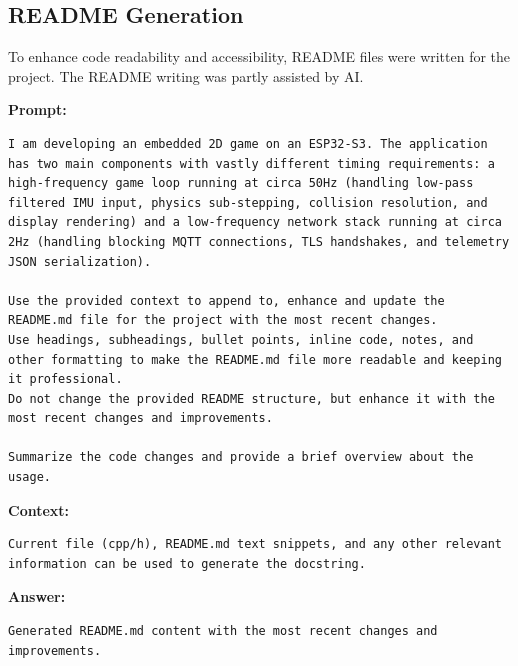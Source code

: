 \subsection*{README Generation}

To enhance code readability and accessibility, README files were written for the project.
The README writing was partly assisted by AI.

\textbf{Prompt:}
\begin{lstlisting}[language={}, breaklines=true]
I am developing an embedded 2D game on an ESP32-S3. The application has two main components with vastly different timing requirements: a high-frequency game loop running at circa 50Hz (handling low-pass filtered IMU input, physics sub-stepping, collision resolution, and display rendering) and a low-frequency network stack running at circa 2Hz (handling blocking MQTT connections, TLS handshakes, and telemetry JSON serialization).

Use the provided context to append to, enhance and update the README.md file for the project with the most recent changes.
Use headings, subheadings, bullet points, inline code, notes, and other formatting to make the README.md file more readable and keeping it professional.
Do not change the provided README structure, but enhance it with the most recent changes and improvements.

Summarize the code changes and provide a brief overview about the usage.
\end{lstlisting}

\textbf{Context:}
\begin{lstlisting}[language={}, breaklines=true]
Current file (cpp/h), README.md text snippets, and any other relevant information can be used to generate the docstring.
\end{lstlisting}

\textbf{Answer:}
\begin{lstlisting}[language={}, breaklines=true]
Generated README.md content with the most recent changes and improvements.
\end{lstlisting}
